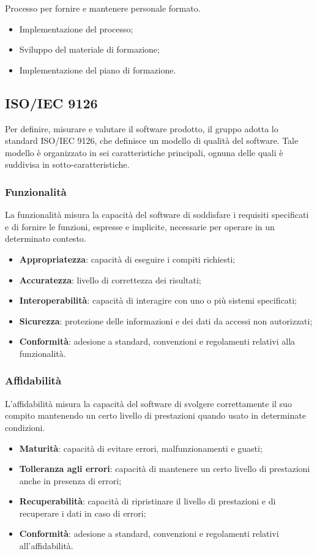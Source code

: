 Processo per fornire e mantenere personale formato.
\begin{itemize}
    \item Implementazione del processo;
    \item Sviluppo del materiale di formazione;
    \item Implementazione del piano di formazione.
\end{itemize}

\subsection{ISO/IEC 9126}
Per definire, misurare e valutare il software prodotto, il gruppo adotta lo 
standard ISO/IEC 9126, che definisce un modello di qualità del software. Tale 
modello è organizzato in sei caratteristiche principali, 
ognuna delle quali è suddivisa in sotto-caratteristiche.

\subsubsection{Funzionalità}
La funzionalità misura la capacità del software di soddisfare i requisiti specificati e di fornire le funzioni,
espresse e implicite, necessarie per operare in un determinato contesto.
\begin{itemize}
    \item \textbf{Appropriatezza}: capacità di eseguire i compiti richiesti;
    \item \textbf{Accuratezza}: livello di correttezza dei risultati;
    \item \textbf{Interoperabilità}: capacità di interagire con uno o più sistemi specificati;
    \item \textbf{Sicurezza}: protezione delle informazioni e dei dati da accessi non autorizzati;
    \item \textbf{Conformità}: adesione a standard, convenzioni e regolamenti relativi alla funzionalità.
\end{itemize}

\subsubsection{Affidabilità}
L'affidabilità misura la capacità del software di svolgere correttamente il suo compito
mantenendo un certo livello di prestazioni quando usato in determinate condizioni.
\begin{itemize}
    \item \textbf{Maturità}: capacità di evitare errori, malfunzionamenti e guasti;
    \item \textbf{Tolleranza agli errori}: capacità di mantenere un certo livello di prestazioni anche in presenza di errori;
    \item \textbf{Recuperabilità}: capacità di ripristinare il livello di prestazioni e di recuperare
        i dati in caso di errori;
    \item \textbf{Conformità}: adesione a standard, convenzioni e regolamenti relativi all'affidabilità.
\end{itemize}

